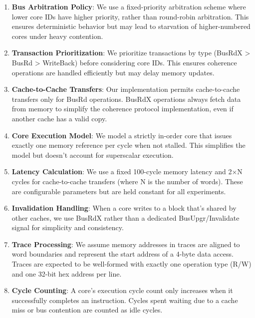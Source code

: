 \documentclass[11pt]{article}
\begin{document}
\begin{enumerate}
    \item \textbf{Bus Arbitration Policy}: We use a fixed-priority arbitration scheme where lower core IDs have higher priority, rather than round-robin arbitration. This ensures deterministic behavior but may lead to starvation of higher-numbered cores under heavy contention.
    
    \item \textbf{Transaction Prioritization}: We prioritize transactions by type (BusRdX > BusRd > WriteBack) before considering core IDs. This ensures coherence operations are handled efficiently but may delay memory updates.
    
    \item \textbf{Cache-to-Cache Transfers}: Our implementation permits cache-to-cache transfers only for BusRd operations. BusRdX operations always fetch data from memory to simplify the coherence protocol implementation, even if another cache has a valid copy.
    
    \item \textbf{Core Execution Model}: We model a strictly in-order core that issues exactly one memory reference per cycle when not stalled. This simplifies the model but doesn't account for superscalar execution.
    
    \item \textbf{Latency Calculation}: We use a fixed 100-cycle memory latency and 2×N cycles for cache-to-cache transfers (where N is the number of words). These are configurable parameters but are held constant for all experiments.
    
    \item \textbf{Invalidation Handling}: When a core writes to a block that's shared by other caches, we use BusRdX rather than a dedicated BusUpgr/Invalidate signal for simplicity and consistency.
    
    \item \textbf{Trace Processing}: We assume memory addresses in traces are aligned to word boundaries and represent the start address of a 4-byte data access. Traces are expected to be well-formed with exactly one operation type (R/W) and one 32-bit hex address per line.
    
    \item \textbf{Cycle Counting}: A core's execution cycle count only increases when it successfully completes an instruction. Cycles spent waiting due to a cache miss or bus contention are counted as idle cycles.
\end{enumerate}
\end{document}

